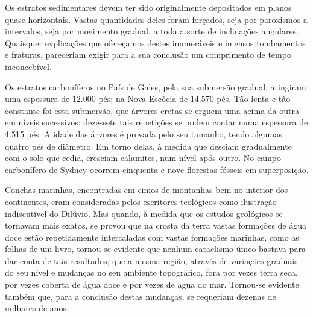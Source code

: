 \documentclass[11pt,a5paper,twoside,openany]{book}
\begin{document}
Os estratos sedimentares devem ter sido originalmente depositados em planos quase horizontais. Vastas quantidades deles foram forçados, seja por paroxismos a intervalos, seja por movimento gradual, a toda a sorte de inclinações angulares. Quaisquer explicações que ofereçamos destes inumeráveis e imensos tombamentos e fraturas, pareceriam exigir para a sua conclusão um comprimento de tempo inconcebível.

Os estratos carboníferos no País de Gales, pela sua submersão gradual, atingiram uma espessura de 12.000 pés; na Nova Escócia de 14.570 pés. Tão lenta e tão constante foi esta submersão, que árvores eretas se erguem uma acima da outra em níveis sucessivos; dezessete tais repetições se podem contar numa espessura de 4.515 pés. A idade das árvores é provada pelo seu tamanho, tendo algumas quatro pés de diâmetro. Em torno delas, à medida que desciam gradualmente com o solo que cedia, cresciam calamites, num nível após outro. No campo carbonífero de Sydney ocorrem cinquenta e nove florestas fósseis em superposição.

Conchas marinhas, encontradas em cimos de montanhas bem no interior dos continentes, eram consideradas pelos escritores teológicos como ilustração indiscutível do Dilúvio. Mas quando, à medida que os estudos geológicos se tornavam mais exatos, se provou que na crosta da terra vastas formações de água doce estão repetidamente intercaladas com vastas formações marinhas, como as folhas de um livro, tornou-se evidente que nenhum cataclismo único bastava para dar conta de tais resultados; que a mesma região, através de variações graduais do seu nível e mudanças no seu ambiente topográfico, fora por vezes terra seca, por vezes coberta de água doce e por vezes de água do mar. Tornou-se evidente também que, para a conclusão destas mudanças, se requeriam dezenas de milhares de anos.
\end{document}
